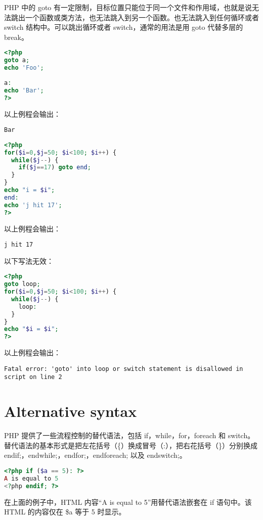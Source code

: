PHP 中的 goto 有一定限制，目标位置只能位于同一个文件和作用域，也就是说无法跳出一个函数或类方法，也无法跳入到另一个函数。也无法跳入到任何循环或者 switch 结构中。可以跳出循环或者 switch，通常的用法是用 goto 代替多层的 break。

\begin{lstlisting}[language=PHP]
<?php
goto a;
echo 'Foo';
 
a:
echo 'Bar';
?>
\end{lstlisting}

以上例程会输出：

\begin{verbatim}
Bar
\end{verbatim}

\begin{lstlisting}[language=PHP]
<?php
for($i=0,$j=50; $i<100; $i++) {
  while($j--) {
    if($j==17) goto end; 
  }  
}
echo "i = $i";
end:
echo 'j hit 17';
?>
\end{lstlisting}

以上例程会输出：

\begin{verbatim}
j hit 17
\end{verbatim}

以下写法无效：

\begin{lstlisting}[language=PHP]
<?php
goto loop;
for($i=0,$j=50; $i<100; $i++) {
  while($j--) {
    loop:
  }
}
echo "$i = $i";
?>
\end{lstlisting}

以上例程会输出：

\begin{verbatim}
Fatal error: 'goto' into loop or switch statement is disallowed in
script on line 2
\end{verbatim}


\section{Alternative syntax}


PHP 提供了一些流程控制的替代语法，包括 if，while，for，foreach 和 switch。替代语法的基本形式是把左花括号（\{）换成冒号（:），把右花括号（\}）分别换成 endif;，endwhile;，endfor;，endforeach; 以及 endswitch;。

\begin{lstlisting}[language=PHP]
<?php if ($a == 5): ?>
A is equal to 5
<?php endif; ?>
\end{lstlisting}


在上面的例子中，HTML 内容“A is equal to 5”用替代语法嵌套在 if 语句中。该 HTML 的内容仅在 \$a 等于 5 时显示。

